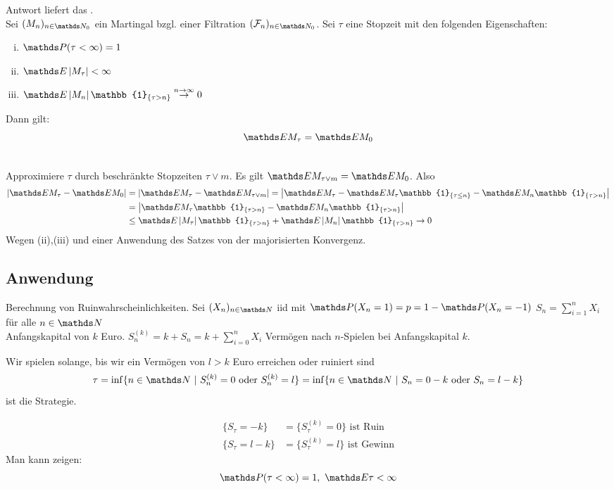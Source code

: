 Antwort liefert das .\\
Sei $(M_n)_{n\in \N_0}$ ein Martingal bzgl. einer Filtration $(\F_n)_{n\in \N_0}$. 
Sei $\tau$ eine Stopzeit mit den folgenden Eigenschaften:
\begin{enumerate}[(i)]
	\item $\Pw(\tau<\infty)=1$
	\item $\E\abs{M_\tau}<\infty$
	\item $\E\abs{M_n}\mathbb{1}_{\{\tau>n\}} \stackrel{n\to\infty}{\to}0$
\end{enumerate}
Dann gilt: 
\[
\E M_\tau=\E M_0 
\]

\\
Approximiere $\tau$ durch beschränkte Stopzeiten $\tau\lor m$. 
Es gilt $\E M_{\tau\lor m} =\E M_0$. 
Also 
\begin{equation*}
\begin{aligned}
	\abs{\E M_\tau-\E M_0}&=\abs{\E M_\tau-\E M_{\tau\lor m}} =\abs{\E M_\tau-\E M_\tau\mathbb{1}_{\{\tau\le n\}}-\E M_n\mathbb{1}_{\{\tau> n\}}}\\
	&= \abs{\E M_\tau\mathbb{1}_{\{\tau> n\}}- \E M_n\mathbb{1}_{\{\tau >n\}}}\\
	&\le \E\abs{M_\tau}\mathbb{1}_{\{\tau> n\}}+ \E\abs{M_n}\mathbb{1}_{\{\tau>n\}} \to 0
\end{aligned}
\end{equation*}
Wegen (ii),(iii) und einer Anwendung des Satzes von der majorisierten Konvergenz.



\subsection{Anwendung}

Berechnung von Ruinwahrscheinlichkeiten. Sei $(X_n)_{n\in \N}$ iid mit $\Pw(X_n=1)=p=1-\Pw(X_n=-1)$ $S_n=\sum_{i=1}^{n} X_i$ für alle $n\in \N$\\
Anfangskapital von $k$ Euro. $S_n^{(k)}=k+S_n=k+\sum_{i=0}^{n} X_i$ Vermögen nach $n$-Spielen bei Anfangskapital $k$.

Wir spielen solange, bis wir ein Vermögen von $l>k$ Euro erreichen oder ruiniert sind 
\[
\tau=\inf\{n\in \N~|~S_n^{(k)}=0\text{ oder } S_n^{(k)}=l \} = \inf\{n\in \N~|~S_n=0-k\text{ oder } S_n=l-k \}
\]
ist die Strategie.

\begin{equation*}
\begin{aligned}
	\{S_\tau=-k\} &= \{S_\tau^{(k)}=0\} \text{ ist Ruin}\\
	\{S_\tau=l-k\} &= \{S_\tau^{(k)}=l\} \text{ ist Gewinn}
\end{aligned}
\end{equation*}
Man kann zeigen: 
\[
\Pw(\tau<\infty)=1,~\E \tau<\infty 
\]

